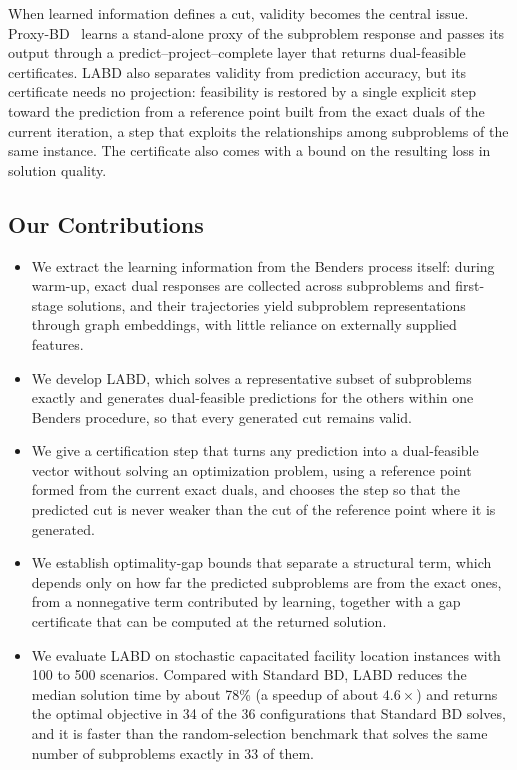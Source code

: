 When learned information defines a cut, validity becomes the central issue. Proxy-BD~\cite{guan2026proxy} learns a stand-alone proxy of the subproblem response and passes its output through a predict--project--complete layer that returns dual-feasible certificates. LABD also separates validity from prediction accuracy, but its certificate needs no projection: feasibility is restored by a single explicit step toward the prediction from a reference point built from the exact duals of the current iteration, a step that exploits the relationships among subproblems of the same instance. The certificate also comes with a bound on the resulting loss in solution quality.

\subsection{Our Contributions}\label{subsec:contributions}
\begin{itemize}
\item We extract the learning information from the Benders process itself: during warm-up, exact dual responses are collected across subproblems and first-stage solutions, and their trajectories yield subproblem representations through graph embeddings, with little reliance on externally supplied features.
\item We develop LABD, which solves a representative subset of subproblems exactly and generates dual-feasible predictions for the others within one Benders procedure, so that every generated cut remains valid.
\item We give a certification step that turns any prediction into a dual-feasible vector without solving an optimization problem, using a reference point formed from the current exact duals, and chooses the step so that the predicted cut is never weaker than the cut of the reference point where it is generated.
\item We establish optimality-gap bounds that separate a structural term, which depends only on how far the predicted subproblems are from the exact ones, from a nonnegative term contributed by learning, together with a gap certificate that can be computed at the returned solution.
\item We evaluate LABD on stochastic capacitated facility location instances with 100 to 500 scenarios. Compared with Standard BD, LABD reduces the median solution time by about 78\% (a speedup of about $4.6\times$) and returns the optimal objective in 34 of the 36 configurations that Standard BD solves, and it is faster than the random-selection benchmark that solves the same number of subproblems exactly in 33 of them.
\end{itemize}

